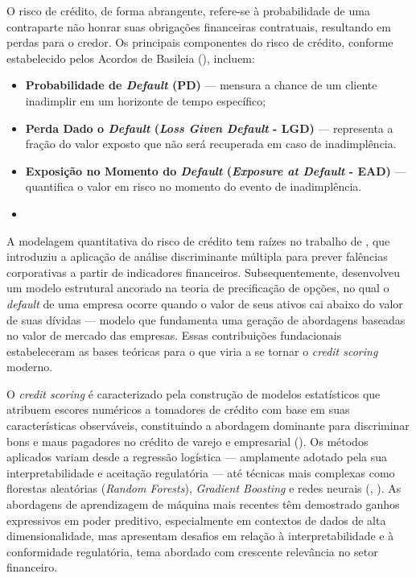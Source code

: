 O risco de crédito, de forma abrangente, refere-se à probabilidade de uma contraparte não honrar suas obrigações financeiras contratuais, resultando em perdas para o credor. Os principais componentes do risco de crédito, conforme estabelecido pelos Acordos de Basileia (\cite{bcbs2004}), incluem:
\begin{itemize}
    \item[(i)]  \textbf{Probabilidade de \textit{Default} (PD)} — mensura a chance de um cliente inadimplir em um horizonte de tempo específico;
    \item[(ii)] \textbf{Perda Dado o \textit{Default} (\textit{Loss Given Default} - LGD)} — representa a fração do valor exposto que não será recuperada em caso de inadimplência.
    \item[(iii)] \textbf{Exposição no Momento do \textit{Default} (\textit{Exposure at Default} - EAD)} — quantifica o valor em risco no momento do evento de inadimplência.
    \item[]
\end{itemize}

A modelagem quantitativa do risco de crédito tem raízes no trabalho de \cite{altman1968}, que introduziu a aplicação de análise discriminante múltipla para prever falências corporativas a partir de indicadores financeiros. Subsequentemente, \cite{merton1974} desenvolveu um modelo estrutural ancorado na teoria de precificação de opções, no qual o \textit{default} de uma empresa ocorre quando o valor de seus ativos cai abaixo do valor de suas dívidas — modelo que fundamenta uma geração de abordagens baseadas no valor de mercado das empresas. Essas contribuições fundacionais estabeleceram as bases teóricas para o que viria a se tornar o \textit{credit scoring} moderno.

O \textit{credit scoring} é caracterizado pela construção de modelos estatísticos que atribuem escores numéricos a tomadores de crédito com base em suas características observáveis, constituindo a abordagem dominante para discriminar bons e maus pagadores no crédito de varejo e empresarial (\cite{siddiqi2006}). Os métodos aplicados variam desde a regressão logística — amplamente adotado pela sua interpretabilidade e aceitação regulatória — até técnicas mais complexas como florestas aleatórias (\textit{Random Forests}), \textit{Gradient Boosting} e redes neurais (\cite{breiman2001}, \cite{friedman2001}). As abordagens de aprendizagem de máquina mais recentes têm demostrado ganhos expressivos em poder preditivo, especialmente em contextos de dados de alta dimensionalidade, mas apresentam desafios em relação à interpretabilidade e à conformidade regulatória, tema abordado com crescente relevância no setor financeiro.

